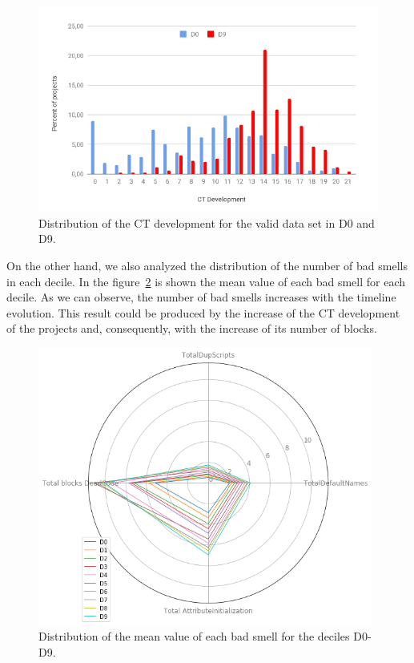 \begin{figure}
    \centering
    \includegraphics[width=12cm,                         keepaspectratio]{img/CT_development.png}
    \caption{Distribution of the CT development for the valid data set in D0 and D9.}
    \label{fig:ct_development}
\end{figure}

On the other hand, we also analyzed the distribution of the number of bad smells in each decile. In the figure~\ref{fig:bad_smells_deciles} is shown the mean value of each bad smell for each decile. As we can observe, the number of bad smells increases with the timeline evolution. This result could be produced by the increase of the CT development of the projects and, consequently, with the increase of its number of blocks.

\begin{figure}
    \centering
    \includegraphics[width=11cm,                         keepaspectratio]{img/bad_smells_deciles.png}
    \caption{Distribution of the mean value of each bad smell for the deciles D0-D9.}
    \label{fig:bad_smells_deciles}
\end{figure}

